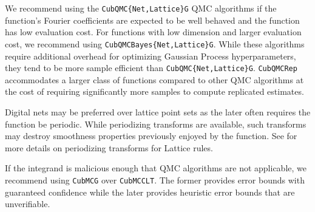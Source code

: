 \documentclass{article}[12pt]
\DeclareMathOperator{\Order}{{\mathcal O}}
\begin{document}
We recommend using the  \texttt{CubQMC\{Net,Lattice\}G} QMC algorithms if the function's Fourier coefficients are expected to be well behaved and the function has low evaluation cost. For functions with low dimension and larger evaluation cost, we recommend using  \texttt{CubQMCBayes\{Net,Lattice\}G}. While these algorithms require additional overhead for optimizing Gaussian Process hyperparameters, they tend to be more sample efficient than \texttt{CubQMC\{Net,Lattice\}G}. \texttt{CubQMCRep} accommodates a larger class of functions compared to other QMC algorithms at the cost of requiring significantly more samples to compute replicated estimates. 

Digital nets may be preferred over lattice point sets as the later often requires the function be periodic. While periodizing transforms are available, such transforms may destroy smoothness properties previously enjoyed by the function. See \cite[Chapter 16]{mcbook} for more details on periodizing transforms for Lattice rules. 

If the integrand is malicious enough that QMC algorithms are not applicable, we recommend using \texttt{CubMCG} over \texttt{CubMCCLT}. The former provides error bounds with guaranteed confidence while the later provides heuristic error bounds that are unverifiable. 


\end{document}
